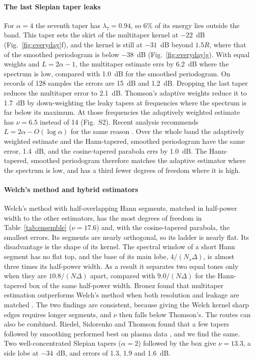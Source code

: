 \documentclass[10pt,twocolumn]{article}
\begin{document}
\paragraph{The last Slepian taper leaks} For $\alpha=4$ the seventh taper has $\lambda_7=0.94$, so 6\% of its energy lies outside the band. This taper sets the skirt of the multitaper kernel at $-22$~dB (Fig.~\ref{fig:everyday}f), and the kernel is still at $-31$~dB beyond $1.5R$, where that of the smoothed periodogram is below $-38$~dB (Fig.~\ref{fig:everyday}g). With equal weights and $L=2\alpha-1$, the multitaper estimate errs by 6.2~dB where the spectrum is low, compared with 1.0~dB for the smoothed periodogram. On records of 128 samples the errors are 15~dB and 1.2~dB. Dropping the last taper reduces the multitaper error to 2.1~dB. Thomson's adaptive weights \cite{thomson1982,thomson1991} reduce it to 1.7~dB by down-weighting the leaky tapers at frequencies where the spectrum is far below its maximum. At those frequencies the adaptively weighted estimate has $\nu=6.5$ instead of 14 (Fig.~S2). Recent analysis recommends $L=2\alpha-O(\log\alpha)$ for the same reason \cite{karnik2022}. Over the whole band the adaptively weighted estimate and the Hann-tapered, smoothed periodogram have the same error, 1.4~dB, and the cosine-tapered parabola errs by 1.0~dB. The Hann-tapered, smoothed periodogram therefore matches the adaptive estimator where the spectrum is low, and has a third fewer degrees of freedom where it is high.

\paragraph{Welch's method and hybrid estimators} Welch's method with half-overlapping Hann segments, matched in half-power width to the other estimators, has the most degrees of freedom in Table~\ref{tab:ensemble} ($\nu=17.6$) and, with the cosine-tapered parabola, the smallest errors. Its segments are nearly orthogonal, so its ladder is nearly flat. Its disadvantage is the shape of its kernel. The spectral window of a short Hann segment has no flat top, and the base of its main lobe, $4/(N_s\Delta)$, is almost three times its half-power width. As a result it separates two equal tones only when they are $10.8/(N\Delta)$ apart, compared with $9.0/(N\Delta)$ for the Hann-tapered box of the same half-power width. Bronez found that multitaper estimation outperforms Welch's method when both resolution and leakage are matched \cite{bronez1992}. The two findings are consistent, because giving the Welch kernel sharp edges requires longer segments, and $\nu$ then falls below Thomson's. The routes can also be combined. Riedel, Sidorenko and Thomson found that a few tapers followed by smoothing performed best on plasma data \cite{riedel1994}, and we find the same. Two well-concentrated Slepian tapers ($\alpha=2$) followed by the box give $\nu=13.3$, a side lobe at $-34$~dB, and errors of 1.3, 1.9 and 1.6~dB.
\end{document}
